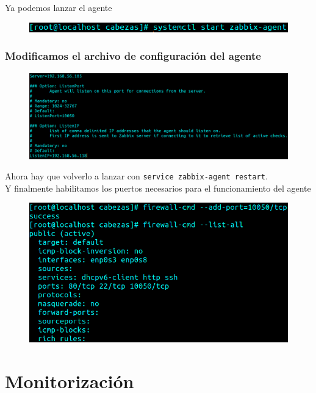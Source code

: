 \documentclass{article}
\begin{document}
Ya podemos lanzar el agente

\begin{figure}[H]
  \centering
  \includegraphics[width=140mm]{screenshots/centos_start-agent}
\end{figure}

\subsubsection*{Modificamos el archivo de configuración del agente}

\begin{figure}[H]
  \centering
  \includegraphics[width=160mm]{screenshots/centos_agent-conf}
\end{figure}


Ahora hay que volverlo a lanzar con \texttt{service zabbix-agent
  restart}. \\ Y finalmente habilitamos los puertos necesarios para el
funcionamiento del agente

\begin{figure}[H]
  \centering
  \includegraphics[width=140mm]{screenshots/firewall-cmd}
\end{figure}

\section{Monitorización}
\end{document}
